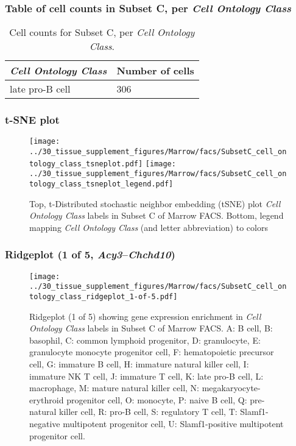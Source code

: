 \subsubsection{Table of cell counts in Subset C, per \emph{Cell Ontology Class}}\begin{table}[h]
\centering
\label{my-label}
\begin{tabular}{@{}ll@{}}
\toprule

\emph{Cell Ontology Class}& Number of cells \\ \midrule
late pro-B cell & 306 \\
\bottomrule
\end{tabular}
\caption{Cell counts for Subset C, per \emph{Cell Ontology Class}.}
\end{table}

\clearpage
\subsubsection{t-SNE plot}
\begin{figure}[h]
\centering
\texttt{[image: ../30\_tissue\_supplement\_figures/Marrow/facs/SubsetC\_cell\_ontology\_class\_tsneplot.pdf]}
\texttt{[image: ../30\_tissue\_supplement\_figures/Marrow/facs/SubsetC\_cell\_ontology\_class\_tsneplot\_legend.pdf]}
\caption{Top, t-Distributed stochastic neighbor embedding (tSNE) plot  \emph{Cell Ontology Class} labels in Subset C of Marrow FACS. Bottom, legend mapping \emph{Cell Ontology Class} (and letter abbreviation) to colors}
\end{figure}


\clearpage

\subsubsection{Ridgeplot (1 of 5, \emph{Acy3}--\emph{Chchd10})}
\begin{figure}[h]
\centering
\texttt{[image: ../30\_tissue\_supplement\_figures/Marrow/facs/SubsetC\_cell\_ontology\_class\_ridgeplot\_1-of-5.pdf]}

\caption{ Ridgeplot (1 of 5)  showing gene expression enrichment in \emph{Cell Ontology Class} labels in Subset C of Marrow FACS. A: B cell, B: basophil, C: common lymphoid progenitor, D: granulocyte, E: granulocyte monocyte progenitor cell, F: hematopoietic precursor cell, G: immature B cell, H: immature natural killer cell, I: immature NK T cell, J: immature T cell, K: late pro-B cell, L: macrophage, M: mature natural killer cell, N: megakaryocyte-erythroid progenitor cell, O: monocyte, P: naive B cell, Q: pre-natural killer cell, R: pro-B cell, S: regulatory T cell, T: Slamf1-negative multipotent progenitor cell, U: Slamf1-positive multipotent progenitor cell.}
\end{figure}


